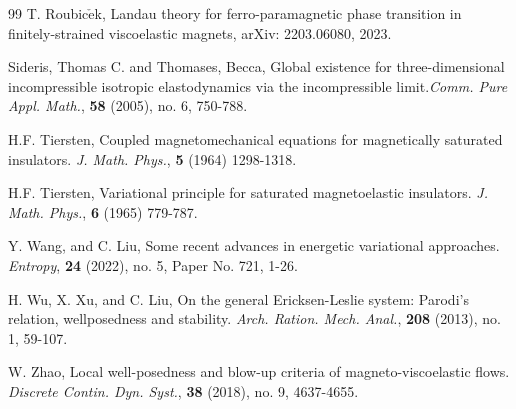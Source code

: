 \documentclass[reqno,11pt]{amsart}
\numberwithin{equation}{section}
\begin{document}
\begin{thebibliography}{99}
 T. Roubic$\check{\mathrm{e}}$k, Landau theory for ferro-paramagnetic phase transition in finitely-strained viscoelastic magnets, arXiv: 2203.06080, 2023.

Sideris, Thomas C. and Thomases, Becca,
Global existence for three-dimensional incompressible isotropic elastodynamics via the incompressible limit.\emph{Comm. Pure Appl. Math.}, {\bf 58} (2005), no. 6, 750-788.

 H.F. Tiersten, Coupled magnetomechanical equations for magnetically saturated insulators. {\em J. Math. Phys.}, \textbf{5} (1964) 1298-1318.

 H.F. Tiersten, Variational principle for saturated magnetoelastic insulators. {\em J. Math. Phys.}, \textbf{6} (1965) 779-787.

 Y. Wang, and C. Liu, Some recent advances in energetic variational approaches.  \emph{Entropy}, {\bf{24}}  (2022), no. 5, Paper No. 721, 1-26.

	H. Wu, X. Xu, and C. Liu, On the general Ericksen-Leslie system: Parodi’s relation, wellposedness and stability. {\em Arch. Ration. Mech. Anal.}, {\bf 208} (2013), no. 1, 59-107. 


 W. Zhao, Local well-posedness and blow-up criteria of magneto-viscoelastic flows. {\em Discrete Contin. Dyn. Syst.}, \textbf{38} (2018), no. 9, 4637-4655.

\end{thebibliography}
\end{document}
